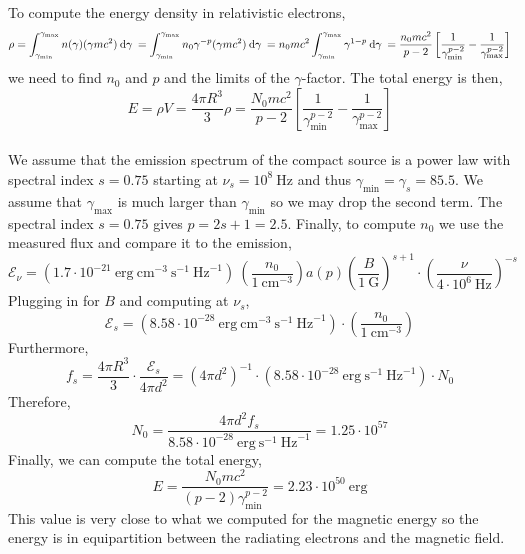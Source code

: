 \documentclass[12pt]{article}
\begin{document}
To compute the energy density in relativistic electrons,
\[ \rho = \int_{\gamma_{\text{min}}}^{\gamma_{\text{max}}} n(\gamma) (\gamma m c^2) \: \mathrm{d}\gamma \: = \int_{\gamma_{\text{min}}}^{\gamma_{\text{max}}} n_0 \gamma^{-p} (\gamma m c^2) \: \mathrm{d}\gamma \: = n_0 m c^2 \int_{\gamma_{\text{min}}}^{\gamma_{\text{max}}} \gamma^{1 - p} \: \mathrm{d}\gamma \: = \frac{n_0 m c^2}{p - 2} \left[ \frac{1}{\gamma_{\text{min}}^{p - 2}} - \frac{1}{\gamma_{\text{max}}^{p - 2}} \right]  \]
we need to find $n_0$ and $p$ and the limits of the $\gamma$-factor. The total energy is then,
\[ E = \rho V = \frac{4 \pi R^3}{3} \rho = \frac{N_0 m c^2}{p - 2} \left[ \frac{1}{\gamma_{\text{min}}^{p - 2}} - \frac{1}{\gamma_{\text{max}}^{p - 2}} \right]   \]
\bigskip\\
We assume that the emission spectrum of the compact source is a power law with spectral index $s = 0.75$ starting at $\nu_s = 10^{8} \: \mathrm{Hz}$ and thus $\gamma_{\text{min}} = \gamma_s = 85.5$. We assume that $\gamma_{\text{max}}$ is much larger than $\gamma_{\text{min}}$ so we may drop the second term. The spectral index $s = 0.75$ gives $p = 2 s + 1 = 2.5$. Finally, to compute $n_0$ we use the measured flux and compare it to the emission,
\[ \mathcal{E}_\nu = (1.7 \cdot 10^{-21} \: \mathrm{erg} \: \mathrm{cm}^{-3} \: \mathrm{s}^{-1} \: \mathrm{Hz}^{-1})  \: \left( \frac{n_0}{1 \: \mathrm{cm}^{-3}} \right) a(p) \left( \frac{B}{1 \: \mathrm{G}} \right)^{s + 1} \cdot \left( \frac{\nu}{4 \cdot 10^6 \: \mathrm{Hz}} \right)^{-s} \]
Plugging in for $B$ and computing at $\nu_s$,
\[ \mathcal{E}_s = (8.58 \cdot 10^{-28} \: \mathrm{erg} \: \mathrm{cm}^{-3} \: \mathrm{s}^{-1} \: \mathrm{Hz}^{-1}) \cdot \left( \frac{n_0}{1 \: \mathrm{cm}^{-3}} \right) \]
Furthermore,
\[ f_s = \frac{4 \pi R^3}{3} \cdot \frac{\mathcal{E}_s}{4 \pi d^2}  = (4 \pi d^2)^{-1} \cdot (8.58 \cdot 10^{-28} \: \mathrm{erg}  \: \mathrm{s}^{-1} \: \mathrm{Hz}^{-1}) \cdot N_0 \]
Therefore,
\[ N_0 = \frac{4 \pi d^2 f_s}{8.58 \cdot 10^{-28} \: \mathrm{erg}  \: \mathrm{s}^{-1} \: \mathrm{Hz}^{-1}} = 1.25 \cdot 10^{57} \]
Finally, we can compute the total energy,
\[ E = \frac{N_0 m c^2}{(p - 2) \gamma_{\text{min}}^{p - 2}} = 2.23 \cdot 10^{50} \: \mathrm{erg} \]
This value is very close to what we computed for the magnetic energy so the energy is in equipartition between the radiating electrons and the magnetic field. 
\end{document}
